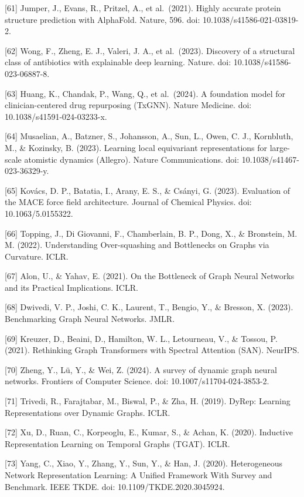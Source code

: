 {[}61{]} Jumper, J., Evans, R., Pritzel, A., et al.~(2021). Highly accurate protein structure prediction with AlphaFold. Nature, 596. doi: 10.1038/s41586-021-03819-2.

{[}62{]} Wong, F., Zheng, E. J., Valeri, J. A., et al.~(2023). Discovery of a structural class of antibiotics with explainable deep learning. Nature. doi: 10.1038/s41586-023-06887-8.

{[}63{]} Huang, K., Chandak, P., Wang, Q., et al.~(2024). A foundation model for clinician-centered drug repurposing (TxGNN). Nature Medicine. doi: 10.1038/s41591-024-03233-x.

{[}64{]} Musaelian, A., Batzner, S., Johansson, A., Sun, L., Owen, C. J., Kornbluth, M., \& Kozinsky, B. (2023). Learning local equivariant representations for large-scale atomistic dynamics (Allegro). Nature Communications. doi: 10.1038/s41467-023-36329-y.

{[}65{]} Kovács, D. P., Batatia, I., Arany, E. S., \& Csányi, G. (2023). Evaluation of the MACE force field architecture. Journal of Chemical Physics. doi: 10.1063/5.0155322.

{[}66{]} Topping, J., Di Giovanni, F., Chamberlain, B. P., Dong, X., \& Bronstein, M. M. (2022). Understanding Over-squashing and Bottlenecks on Graphs via Curvature. ICLR.

{[}67{]} Alon, U., \& Yahav, E. (2021). On the Bottleneck of Graph Neural Networks and its Practical Implications. ICLR.

{[}68{]} Dwivedi, V. P., Joshi, C. K., Laurent, T., Bengio, Y., \& Bresson, X. (2023). Benchmarking Graph Neural Networks. JMLR.

{[}69{]} Kreuzer, D., Beaini, D., Hamilton, W. L., Letourneau, V., \& Tossou, P. (2021). Rethinking Graph Transformers with Spectral Attention (SAN). NeurIPS.

{[}70{]} Zheng, Y., Lü, Y., \& Wei, Z. (2024). A survey of dynamic graph neural networks. Frontiers of Computer Science. doi: 10.1007/s11704-024-3853-2.

{[}71{]} Trivedi, R., Farajtabar, M., Biswal, P., \& Zha, H. (2019). DyRep: Learning Representations over Dynamic Graphs. ICLR.

{[}72{]} Xu, D., Ruan, C., Korpeoglu, E., Kumar, S., \& Achan, K. (2020). Inductive Representation Learning on Temporal Graphs (TGAT). ICLR.

{[}73{]} Yang, C., Xiao, Y., Zhang, Y., Sun, Y., \& Han, J. (2020). Heterogeneous Network Representation Learning: A Unified Framework With Survey and Benchmark. IEEE TKDE. doi: 10.1109/TKDE.2020.3045924.

